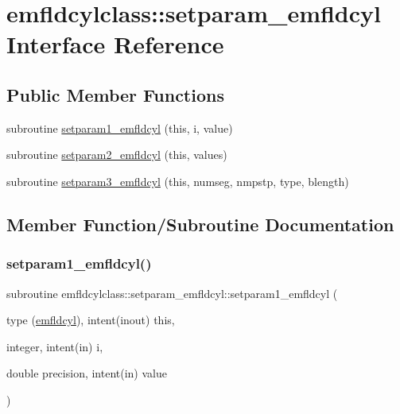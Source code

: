 \hypertarget{interfaceemfldcylclass_1_1setparam__emfldcyl}{}\section{emfldcylclass\+::setparam\+\_\+emfldcyl Interface Reference}
\label{interfaceemfldcylclass_1_1setparam__emfldcyl}
\subsection*{Public Member Functions}
\begin{DoxyCompactItemize}
\item 
subroutine \mbox{\hyperlink{interfaceemfldcylclass_1_1setparam__emfldcyl_aad552af33be1119adf1d4ad61b7590eb}{setparam1\+\_\+emfldcyl}} (this, i, value)
\item 
subroutine \mbox{\hyperlink{interfaceemfldcylclass_1_1setparam__emfldcyl_a15b0af2713585b7527d5fa5edd6f6fda}{setparam2\+\_\+emfldcyl}} (this, values)
\item 
subroutine \mbox{\hyperlink{interfaceemfldcylclass_1_1setparam__emfldcyl_a3165039bca593a44285d18f0629ec79d}{setparam3\+\_\+emfldcyl}} (this, numseg, nmpstp, type, blength)
\end{DoxyCompactItemize}


\subsection{Member Function/\+Subroutine Documentation}
\mbox{\label{interfaceemfldcylclass_1_1setparam__emfldcyl_aad552af33be1119adf1d4ad61b7590eb}} 
\subsubsection{\texorpdfstring{setparam1\_emfldcyl()}{setparam1\_emfldcyl()}}
{\footnotesize\ttfamily subroutine emfldcylclass\+::setparam\+\_\+emfldcyl\+::setparam1\+\_\+emfldcyl (\begin{DoxyParamCaption}\item[{type (\mbox{\hyperlink{namespaceemfldcylclass_structemfldcylclass_1_1emfldcyl}{emfldcyl}}), intent(inout)}]{this,  }\item[{integer, intent(in)}]{i,  }\item[{double precision, intent(in)}]{value }\end{DoxyParamCaption})}

